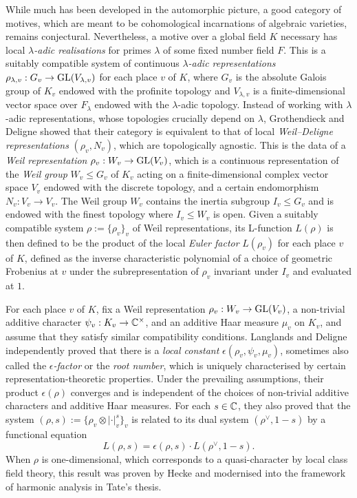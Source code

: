 While much has been developed in the automorphic picture, a good category of motives, which are meant to be cohomological incarnations of algebraic varieties, remains conjectural. Nevertheless, a motive over a global field $ K $ necessary has local \emph{$ \lambda $-adic realisations} for primes $ \lambda $ of some fixed number field $ F $. This is a suitably compatible system of continuous \emph{$ \lambda $-adic representations} $ \rho_{\lambda, v} : G_v \to \operatorname{GL}(V_{\lambda, v}) $ for each place $ v $ of $ K $, where $ G_v $ is the absolute Galois group of $ K_v $ endowed with the profinite topology and $ V_{\lambda, v} $ is a finite-dimensional vector space over $ F_\lambda $ endowed with the $ \lambda $-adic topology. Instead of working with $ \lambda $-adic representations, whose topologies crucially depend on $ \lambda $, Grothendieck and Deligne showed that their category is equivalent to that of local \emph{Weil--Deligne representations} $ (\rho_v, N_v) $, which are topologically agnostic. This is the data of a \emph{Weil representation} $ \rho_v : W_v \to \operatorname{GL}(V_v) $, which is a continuous representation of the \emph{Weil group} $ W_v \le G_v $ of $ K_v $ acting on a finite-dimensional complex vector space $ V_v $ endowed with the discrete topology, and a certain endomorphism $ N_v : V_v \to V_v $. The Weil group $ W_v $ contains the inertia subgroup $ I_v \le G_v $ and is endowed with the finest topology where $ I_v \le W_v $ is open. Given a suitably compatible system $ \rho := \{\rho_v\}_v $ of Weil representations, its L-function $ L(\rho) $ is then defined to be the product of the local \emph{Euler factor} $ L(\rho_v) $ for each place $ v $ of $ K $, defined as the inverse characteristic polynomial of a choice of geometric Frobenius at $ v $ under the subrepresentation of $ \rho_v $ invariant under $ I_v $ and evaluated at $ 1 $.

For each place $ v $ of $ K $, fix a Weil representation $ \rho_v : W_v \to \operatorname{GL}(V_v) $, a non-trivial additive character $ \psi_v : K_v \to \mathbb{C}^\times $, and an additive Haar measure $ \mu_v $ on $ K_v $, and assume that they satisfy similar compatibility conditions. Langlands and Deligne independently proved that there is a \emph{local constant} $ \epsilon(\rho_v, \psi_v, \mu_v) $, sometimes also called the \emph{$ \epsilon $-factor} or the \emph{root number}, which is uniquely characterised by certain representation-theoretic properties. Under the prevailing assumptions, their product $ \epsilon(\rho) $ converges and is independent of the choices of non-trivial additive characters and additive Haar measures. For each $ s \in \mathbb{C} $, they also proved that the system $ (\rho, s) := \{\rho_v \otimes |\cdot|_v^s\}_v $ is related to its dual system $ (\rho^\vee, 1 - s) $ by a functional equation
$$ L(\rho, s) = \epsilon(\rho, s) \cdot L(\rho^\vee, 1 - s). $$
When $ \rho $ is one-dimensional, which corresponds to a quasi-character by local class field theory, this result was proven by Hecke and modernised into the framework of harmonic analysis in Tate's thesis.


